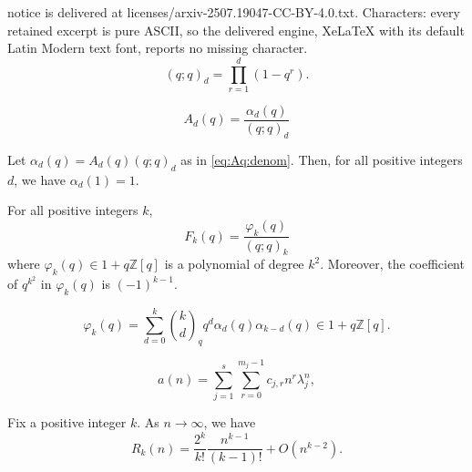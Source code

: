 \documentclass[10pt,a4paper]{amsart}
\newcommand{\rightarrowlim}{\mathop{\rightarrow}\limits}
\begin{document}
notice is delivered at licenses/arxiv-2507.19047-CC-BY-4.0.txt. Characters: every retained excerpt is pure ASCII, so the delivered engine, XeLaTeX with its default Latin Modern text font, reports no missing character.
\begin{equation}
  (q ; q)_d = \prod_{r = 1}^d (1 - q^r) . \label{eq:qpochhammer}
\end{equation}

  \begin{equation}
    A_d (q) = \frac{\alpha_d (q)}{(q ; q)_d} \label{eq:Aq:denom}
  \end{equation}

\begin{corollary}
  \label{cor:alphad:1}Let $\alpha_d (q) = A_d (q) (q ; q)_d$ as in
  \eqref{eq:Aq:denom}. Then, for all positive integers $d$, we have $\alpha_d
  (1) = 1$.
\end{corollary}

\begin{theorem}
  \label{thm:Fk:denom}For all positive integers $k$,
  \begin{equation}
    F_k (q) = \frac{\varphi_k (q)}{(q ; q)_k} \label{eq:Fk:denom}
  \end{equation}
  where $\varphi_k (q) \in 1 + q\mathbb{Z} [q]$ is a polynomial of degree
  $k^2$. Moreover, the coefficient of $q^{k^2}$ in $\varphi_k (q)$ is $(-
  1)^{k - 1}$.
\end{theorem}

  \begin{equation}
    \varphi_k (q) = \sum_{d = 0}^k \binom{k}{d}_q q^d \alpha_d (q) \alpha_{k -
    d} (q) \in 1 + q\mathbb{Z} [q] . \label{eq:phik:alpha}
  \end{equation}

\begin{equation}
  a (n) = \sum_{j = 1}^s \sum_{r = 0}^{m_j - 1} c_{j, r} n^r \lambda_j^n,
  \label{eq:cfinite:exact}
\end{equation}

\begin{theorem}
  \label{thm:Rk:asy}Fix a positive integer $k$. As $n \rightarrowlim \infty$,
  we have
  \begin{equation}
    R_k (n) = \frac{2^k}{k!} \frac{n^{k - 1}}{(k - 1) !} + O (n^{k - 2}) .
    \label{eq:Rk:asy:first}
  \end{equation}
\end{theorem}
\end{document}
